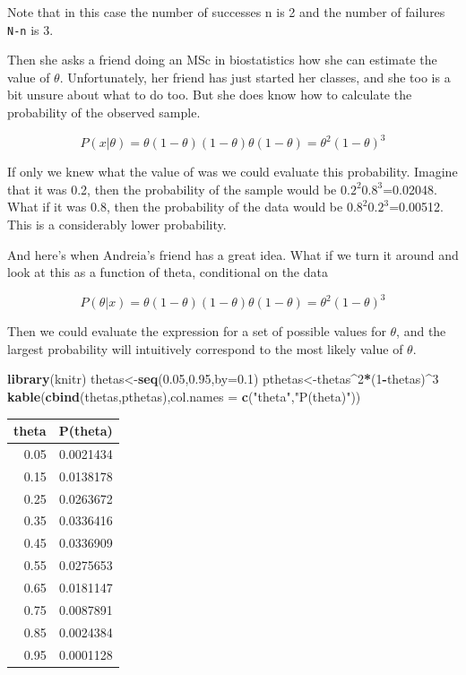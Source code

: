 \documentclass[
]{book}
\newenvironment{Shaded}{\begin{snugshade}}{\end{snugshade}}
\newcommand{\DataTypeTok}[1]{\textcolor[rgb]{0.13,0.29,0.53}{#1}}
\newcommand{\DecValTok}[1]{\textcolor[rgb]{0.00,0.00,0.81}{#1}}
\newcommand{\FloatTok}[1]{\textcolor[rgb]{0.00,0.00,0.81}{#1}}
\newcommand{\KeywordTok}[1]{\textcolor[rgb]{0.13,0.29,0.53}{\textbf{#1}}}
\newcommand{\NormalTok}[1]{#1}
\newcommand{\OperatorTok}[1]{\textcolor[rgb]{0.81,0.36,0.00}{\textbf{#1}}}
\newcommand{\StringTok}[1]{\textcolor[rgb]{0.31,0.60,0.02}{#1}}
\begin{document}
Note that in this case the number of successes n is 2 and the number of failures \texttt{N-n} is 3.

Then she asks a friend doing an MSc in biostatistics how she can estimate the value of \(\theta\). Unfortunately, her friend has just started her classes, and she too is a bit unsure about what to do too. But she does know how to calculate the probability of the observed sample.

\[P(x|\theta)=\theta (1-\theta) (1-\theta) \theta (1-\theta)=\theta^2 (1-\theta)^3\]

If only we knew what the value of \theta was we could evaluate this probability. Imagine that it was 0.2, then the probability of the sample would be \(0.2^2 0.8^3\)=0.02048. What if it was 0.8, then the probability of the data would be \(0.8^2 0.2^3\)=0.00512. This is a considerably lower probability.

And here's when Andreia's friend has a great idea. What if we turn it around and look at this as a function of theta, conditional on the data

\[P(\theta|x)=\theta (1-\theta) (1-\theta) \theta (1-\theta)=\theta^2 (1-\theta)^3\]

Then we could evaluate the expression for a set of possible values for \(\theta\), and the largest probability will intuitively correspond to the most likely value of \(\theta\).

\begin{Shaded}
\begin{Highlighting}[]
\KeywordTok{library}\NormalTok{(knitr)}
\NormalTok{thetas<-}\KeywordTok{seq}\NormalTok{(}\FloatTok{0.05}\NormalTok{,}\FloatTok{0.95}\NormalTok{,}\DataTypeTok{by=}\FloatTok{0.1}\NormalTok{)}
\NormalTok{pthetas<-thetas}\OperatorTok{^}\DecValTok{2}\OperatorTok{*}\NormalTok{(}\DecValTok{1}\OperatorTok{-}\NormalTok{thetas)}\OperatorTok{^}\DecValTok{3}
\KeywordTok{kable}\NormalTok{(}\KeywordTok{cbind}\NormalTok{(thetas,pthetas),}\DataTypeTok{col.names =} \KeywordTok{c}\NormalTok{(}\StringTok{"theta"}\NormalTok{,}\StringTok{"P(theta)"}\NormalTok{))}
\end{Highlighting}
\end{Shaded}

\begin{tabular}{r|r}
\hline
theta & P(theta)\\
\hline
0.05 & 0.0021434\\
\hline
0.15 & 0.0138178\\
\hline
0.25 & 0.0263672\\
\hline
0.35 & 0.0336416\\
\hline
0.45 & 0.0336909\\
\hline
0.55 & 0.0275653\\
\hline
0.65 & 0.0181147\\
\hline
0.75 & 0.0087891\\
\hline
0.85 & 0.0024384\\
\hline
0.95 & 0.0001128\\
\hline
\end{tabular}
\end{document}
